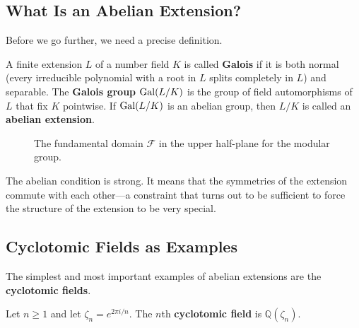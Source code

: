 \subsection{What Is an Abelian Extension?}

Before we go further, we need a precise definition.

\begin{definition}
A finite extension $L$ of a number field $K$ is called \textbf{Galois} if it is both normal (every irreducible polynomial with a root in $L$ splits completely in $L$) and separable. The \textbf{Galois group} $\operatorname{Gal}(L/K)$ is the group of field automorphisms of $L$ that fix $K$ pointwise. If $\operatorname{Gal}(L/K)$ is an abelian group, then $L/K$ is called an \textbf{abelian extension}.
\end{definition}

\begin{figure}[htbp]
\centering
{}
\caption{The fundamental domain $\mathcal{F}$ in the upper half-plane for the modular group.}
\label{fig:fundamental-domain}
\end{figure}

The abelian condition is strong. It means that the symmetries of the extension commute with each other---a constraint that turns out to be sufficient to force the structure of the extension to be very special.

\subsection{Cyclotomic Fields as Examples}

The simplest and most important examples of abelian extensions are the \textbf{cyclotomic fields}.

\begin{definition}
Let $n \geq 1$ and let $\zeta_n = e^{2\pi i/n}$. The $n$th \textbf{cyclotomic field} is $\mathbb{Q}(\zeta_n)$.
\end{definition}

